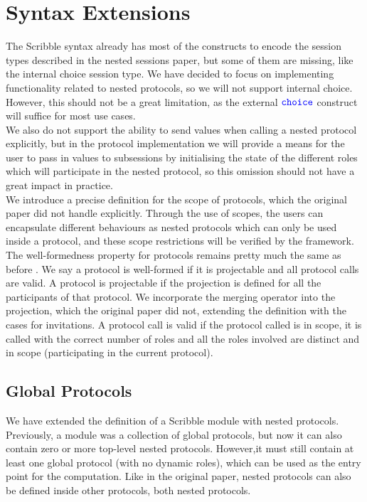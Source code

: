 \documentclass[12pt,twoside]{report}
\begin{document}
\section{Syntax Extensions} 

The Scribble syntax already has most of the constructs to encode the session types described in the nested sessions paper\cite{nestedprotocols}, but some of them are missing, like the internal choice session type. We have decided to focus on implementing functionality related to nested protocols, so we will not support internal choice. However, this should not be a great limitation, as the external ${\color{blue}\mathtt{choice}}$ construct will suffice for most use cases.
\\

We also do not support the ability to send values when calling a nested protocol explicitly, but in the protocol implementation we will provide a means for the user to pass in values to subsessions by initialising the state of the different roles which will participate in the nested protocol, so this omission should not have a great impact in practice.\\

We introduce a precise definition for the scope of protocols, which the original paper did not handle explicitly. Through the use of scopes, the users can encapsulate different behaviours as nested protocols which can only be used inside a protocol, and these scope restrictions will be verified by the framework.\\

The well-formedness property for protocols remains pretty much the same as before \cite{nestedprotocols}\cite{featherweight}. We say a protocol is well-formed if it is projectable and all protocol calls are valid. A protocol is projectable if the projection is defined for all the participants of that protocol. We incorporate the merging operator into the projection, which the original paper did not, extending the definition with the cases for invitations. A protocol call is valid if the protocol called is in scope, it is called with the correct number of roles and all the roles involved are distinct and in scope (participating in the current protocol).

\subsection{Global Protocols}

We have extended the definition of a Scribble module with nested protocols. Previously, a module was a collection of global protocols, but now it can also contain zero or more top-level nested protocols. However,it must still contain at least one global protocol (with no dynamic roles), which can be used as the entry point for the computation. Like in the original paper, nested protocols can also be defined inside other protocols, both nested protocols.\\
\end{document}
